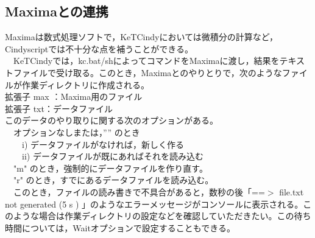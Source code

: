 \documentclass[papersize,a4paper,12pt,uplatex]{jsarticle}
\begin{document}
\subsection{Maximaとの連携}
Maximaは数式処理ソフトで，KeTCindyにおいては微積分の計算など，Cindyscriptでは不十分な点を補うことができる。\\
　KeTCindyでは，kc.bat/shによってコマンドをMaximaに渡し，結果をテキストファイルで受け取る。このとき，Maximaとのやりとりで，次のようなファイルが作業ディレクトリに作成される。\\
拡張子 max ：Maxima用のファイル\\
拡張子 txt：データファイル\\
このデータのやり取りに関する次のオプションがある。\\
　オプションなしまたは，”” のとき\\
　　i) データファイルがなければ，新しく作る\\
　　ii) データファイルが既にあればそれを読み込む\\
　"m"  のとき，強制的にデータファイルを作り直す。\\
　"r" のとき，すでにあるデータファイルを読み込む。\\ 
　このとき，ファイルの読み書きで不具合があると，数秒の後「==$>$ file.txt not generated (5 s ) 」のようなエラーメッセージがコンソールに表示される。このような場合は作業ディレクトリの設定などを確認していただきたい。この待ち時間については，Waitオプションで設定することもできる。\\
\end{document}
